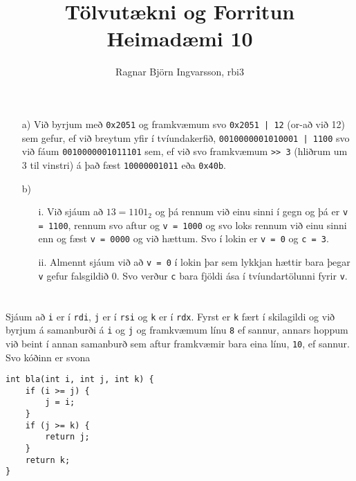 \documentclass{article}
\title{Tölvutækni og Forritun Heimadæmi 10}
\author{Ragnar Björn Ingvarsson, rbi3}
\begin{document}
\renewcommand\thepage{}

	\maketitle

	\newpage
	\setcounter{page}{1}
	\renewcommand\thepage{\arabic{page}}

	\section{}
	\begin{itemize}
		\item[a)] Við byrjum með \texttt{0x2051} og framkvæmum svo 
			\texttt{0x2051 | 12} (or-að við 12) sem gefur, ef við breytum yfir í 
			tvíundakerfið, \texttt{0010000001010001 | 1100} svo við fáum 
			\texttt{0010000001011101} sem, ef við svo framkvæmum \texttt{>{}> 3} (hliðrum um 3 til vinstri) 
			á það fæst \texttt{10000001011} eða \texttt{0x40b}.
		\item[b)] 
			\begin{itemize}
				\item[i.] Við sjáum að $13 = 1101_2$ og þá rennum við einu 
					sinni í gegn og þá er \texttt{v = 1100}, rennum svo 
					aftur og \texttt{v = 1000} og svo loks rennum við 
					einu sinni enn og fæst \texttt{v = 0000} og við 
					hættum. Svo í lokin er \texttt{v = 0} og 
					\texttt{c = 3}.
				\item[ii.] Almennt sjáum við að \texttt{v = 0} í lokin 
					þar sem lykkjan hættir bara þegar \texttt{v} gefur 
					falsgildið $0$. Svo verður \texttt{c} bara fjöldi ása 
					í tvíundartölunni fyrir \texttt{v}.
			\end{itemize}
	\end{itemize}

	\section{}
	Sjáum að \texttt{i} er í \texttt{rdi}, \texttt{j} er í \texttt{rsi} og 
	\texttt{k} er í \texttt{rdx}. Fyrst er \texttt{k} fært í skilagildi og 
	við byrjum á samanburði á \texttt{i} og \texttt{j} og framkvæmum línu 
	\texttt{8} ef sannur, annars hoppum við beint í annan samanburð sem 
	aftur framkvæmir bara eina línu, \texttt{10}, ef sannur. Svo kóðinn er 
	svona
	\begin{verbatim}
int bla(int i, int j, int k) {
	if (i >= j) {
	    j = i;
	}
	if (j >= k) {
	    return j;
	}
	return k;
}
	\end{verbatim}
\end{document}
